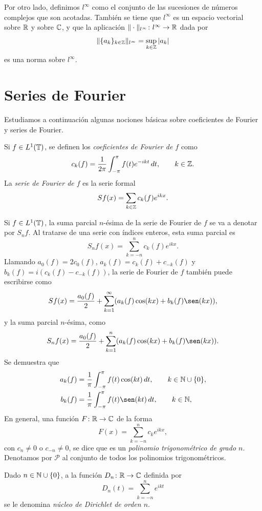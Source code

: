 \documentclass[a4paper, 12pt, oneside]{book}
\begin{document}
Por otro lado, definimos $l^\infty$ como el conjunto de las sucesiones de números complejos que son acotadas. También se tiene que $l^\infty$ es un espacio vectorial sobre $\mathbb R$ y sobre $\mathbb C$, y que la aplicación $\|\cdot\|_{l^\infty} \colon l^\infty \to \mathbb R$ dada por
\[\|\{a_k\}_{k\in\mathbb Z}\|_{l^\infty} = \sup_{k\in\mathbb Z} |a_k|\]
es una norma sobre $l^\infty$.

\section{Series de Fourier}

Estudiamos a continuación algunas nociones básicas sobre coeficientes de Fourier y series de Fourier.

\begin{definition}
    Si $f \in L^1(\mathbb T)$, se definen los \emph{coeficientes de Fourier de $f$} como
    \[c_k(f) = \frac{1}{2\pi}\int_{-\pi}^{\pi} f(t)e^{-ikt} \, dt, \qquad k \in \mathbb Z.\]
    La \emph{serie de Fourier de $f$} es la serie formal
    \[Sf(x) = \sum_{ k \in \mathbb Z} c_k(f)e^{ikx}.\]
\end{definition}

Si $f \in L^1(\mathbb T)$, la suma parcial $n$-ésima de la serie de Fourier de $f$ se va a denotar por $S_nf$. Al tratarse de una serie con índices enteros, esta suma parcial es
\[S_nf(x) = \sum_{k=-n}^n c_k(f)e^{ikx}.\]
Llamando $a_0(f) = 2c_0(f)$, $a_k(f) = c_k(f)+c_{-k}(f)$ y $b_k(f) = i(c_k(f)-c_{-k}(f))$, la serie de Fourier de $f$ también puede escribirse como
\[Sf(x) = \frac{a_0(f)}{2}+\sum_{k=1}^\infty (a_k(f)\cos(kx)+b_k(f)\sen(kx)),\]
y la suma parcial $n$-ésima, como
\[S_nf(x) = \frac{a_0(f)}{2}+\sum_{k=1}^{n}(a_k(f)\cos(kx)+b_k(f)\sen(kx)).\]
Se demuestra que
\begin{align*}
    a_k(f) &= \frac{1}{\pi}\integral{-\pi}{\pi}{f(t)\cos(kt)}, \qquad k \in \N\cup\{0\}, \\
    b_k(f) &= \frac{1}{\pi}\integral{-\pi}{\pi}{f(t)\sen(kt)}, \qquad k \in \N,
\end{align*}
En general, una función $F \colon \mathbb R \to \mathbb C$ de la forma
\[F(x) = \sum_{k=-n}^n c_ke^{ikx},\]
con $c_n \neq 0$ o $c_{-n}\neq 0$, se dice que es un \emph{polinomio trigonométrico de grado $n$}. Denotamos por $\mathcal{P}$ al conjunto de todos los polinomios trigonométricos.

\begin{definition}
    Dado $n \in \mathbb N \cup \{0\}$, a la función $D_n \colon \mathbb R \to \mathbb C$ definida por
    \[D_n(t) = \sum_{k=-n}^n e^{ikt}\]
    se le denomina \emph{núcleo de Dirichlet de orden $n$}.
\end{definition}
\end{document}
